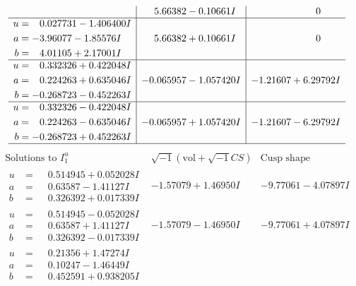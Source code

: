 \documentclass[1p]{elsarticle_modified}
\theoremstyle{definition}
\newcommand{\I}{\sqrt{-1}}
\begin{document}
$$\begin{array}{c|c|c}
 & \phantom{-}5.66382 - 0.10661 I & \phantom{-0.000000 } 0 \\ \hline\begin{aligned}
u &= \phantom{-}0.027731 - 1.406400 I \\
a &= -3.96077 - 1.85576 I \\
b &= \phantom{-}4.01105 + 2.17001 I\end{aligned}
 & \phantom{-}5.66382 + 0.10661 I & \phantom{-0.000000 } 0 \\ \hline\begin{aligned}
u &= \phantom{-}0.332326 + 0.422048 I \\
a &= \phantom{-}0.224263 + 0.635046 I \\
b &= -0.268723 - 0.452263 I\end{aligned}
 & -0.065957 - 1.057420 I & -1.21607 + 6.29792 I \\ \hline\begin{aligned}
u &= \phantom{-}0.332326 - 0.422048 I \\
a &= \phantom{-}0.224263 - 0.635046 I \\
b &= -0.268723 + 0.452263 I\end{aligned}
 & -0.065957 + 1.057420 I & -1.21607 - 6.29792 I\\
 \hline 
 \end{array}$$\newpage$$\begin{array}{c|c|c}  
\text{Solutions to }I^u_{1}& \I (\text{vol} + \sqrt{-1}CS) & \text{Cusp shape}\\
 \hline 
\begin{aligned}
u &= \phantom{-}0.514945 + 0.052028 I \\
a &= \phantom{-}0.63587 - 1.41127 I \\
b &= \phantom{-}0.326392 + 0.017339 I\end{aligned}
 & -1.57079 + 1.46950 I & -9.77061 - 4.07897 I \\ \hline\begin{aligned}
u &= \phantom{-}0.514945 - 0.052028 I \\
a &= \phantom{-}0.63587 + 1.41127 I \\
b &= \phantom{-}0.326392 - 0.017339 I\end{aligned}
 & -1.57079 - 1.46950 I & -9.77061 + 4.07897 I \\ \hline\begin{aligned}
u &= \phantom{-}0.21356 + 1.47274 I \\
a &= \phantom{-}0.10247 - 1.46449 I \\
b &= \phantom{-}0.452591 + 0.938205 I\end{aligned}

\end{array}$$
\end{document}

